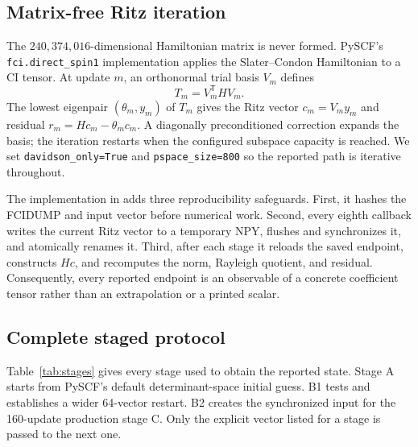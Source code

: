 \documentclass[aps,onecolumn,superscriptaddress,nofootinbib,longbibliography]{revtex4-2}
\begin{document}
\subsection{Matrix-free Ritz iteration}

The \(240{,}374{,}016\)-dimensional Hamiltonian matrix is never formed.
PySCF's \texttt{fci.direct\_spin1} implementation applies the Slater--Condon
Hamiltonian to a CI tensor.  At update \(m\), an orthonormal trial basis
\(V_m\) defines
\begin{equation}
 T_m=V_m^{\mathsf T}HV_m.
\end{equation}
The lowest eigenpair \((\theta_m,y_m)\) of \(T_m\) gives the Ritz vector
\(c_m=V_my_m\) and residual \(r_m=Hc_m-\theta_mc_m\).  A diagonally
preconditioned correction expands the basis; the iteration restarts when the
configured subspace capacity is reached.  We set
\texttt{davidson\_only=True} and \texttt{pspace\_size=800} so the reported path
is iterative throughout.

The implementation in  adds three
reproducibility safeguards.  First, it hashes the FCIDUMP and input vector
before numerical work.  Second, every eighth callback writes the current Ritz
vector to a temporary NPY, flushes and synchronizes it, and atomically renames
it.  Third, after each stage it reloads the saved endpoint, constructs \(Hc\),
and recomputes the norm, Rayleigh quotient, and residual.  Consequently, every
reported endpoint is an observable of a concrete coefficient tensor rather
than an extrapolation or a printed scalar.

\subsection{Complete staged protocol}

Table~\ref{tab:stages} gives every stage used to obtain the reported state.
Stage A starts from PySCF's default determinant-space initial guess.  B1 tests
and establishes a wider 64-vector restart.  B2 creates the synchronized input
for the 160-update production stage C.  Only the explicit vector listed for a
stage is passed to the next one.
\end{document}
